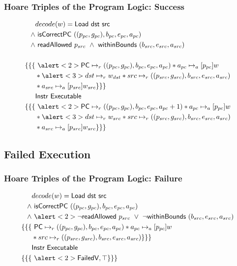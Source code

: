 \documentclass{beamer}
\begin{document}
\begin{frame}
\frametitle{Hoare Triples of the Program Logic: Success}

\begin{align*}
&decode(w) = \textsf{Load dst src} \\
\wedge &\textsf{ isCorrectPC }((p_{pc},g_{pc}),b_{pc},e_{pc},a_{pc}) \\
\wedge &\textsf{ readAllowed } p_{src} ~\wedge~  \textsf{withinBounds } (b_{src},e_{src},a_{src})\\ \\
\{\{\{&~ \alert<2>{\textsf{PC} \mapsto_r ((p_{pc},g_{pc}),b_{pc},e_{pc},a_{pc})} * a_{pc} \mapsto_a[p_{pc}] w \\
&* \alert<3>{dst \mapsto_r w_{dst}} * src \mapsto_r ((p_{src},g_{src}),b_{src},e_{src},a_{src}) \\
&* a_{src} \mapsto_a[p_{src}] w_{src} \}\}\} \\
&\textsf{Instr Executable} \\
\{\{\{&~  \alert<2>{\textsf{PC} \mapsto_r ((p_{pc},g_{pc}),b_{pc},e_{pc},a_{pc} + 1)}
			  * a_{pc} \mapsto_a[p_{pc}] w
			  \\&* \alert<3>{dst \mapsto_r w_{src}}
			  * src \mapsto_r ((p_{src},g_{src}),b_{src},e_{src},a_{src})
			   \\&* a_{src} \mapsto_a[p_{src}] w_{src} \}\}\}
\end{align*}

\end{frame}

\subsection{Failed Execution}

\begin{frame}
\frametitle{Hoare Triples of the Program Logic: Failure}

\begin{align*}
&decode(w) = \textsf{Load dst src} \\
\wedge &\textsf{ isCorrectPC }((p_{pc},g_{pc}),b_{pc},e_{pc},a_{pc}) \\
\wedge &~\alert<2>{\neg \textsf{readAllowed } p_{src}} ~\vee~ \neg \textsf{withinBounds } (b_{src},e_{src},a_{src})\\
\{\{\{&~\textsf{PC} \mapsto_r ((p_{pc},g_{pc}),b_{pc},e_{pc},a_{pc}) * a_{pc} \mapsto_a[p_{pc}] w \\
&* src \mapsto_r ((p_{src},g_{src}),b_{src},e_{src},a_{src}) \}\}\} \\
&\textsf{Instr Executable} \\
\{\{\{&~ \alert<2>{\textsf{FailedV}}, \top \}\}\}
\end{align*}

\end{frame}
\end{document}
